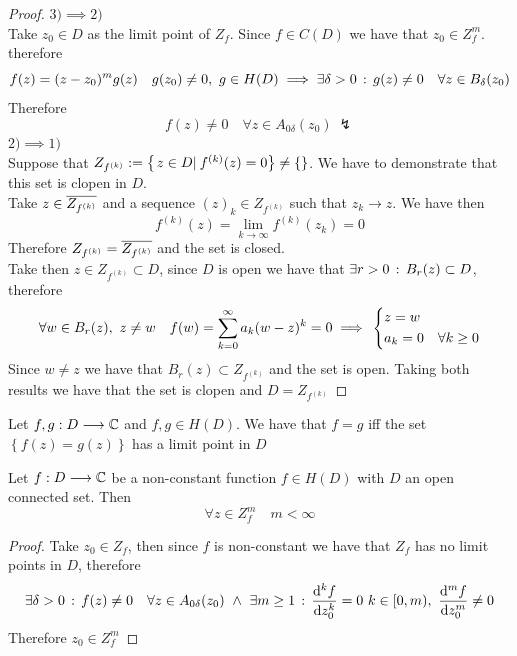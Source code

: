 \documentclass[../complete.tex]{subfiles}
\begin{document}
\begin{proof}
	$3)\implies{} 2)$\\
	Take $z_0\in D$ as the limit point of $Z_f$. Since $f\in C(D)$ we have that $z_0\in Z_f^m$. therefore
	\begin{equation*}
		f(z)=(z-z_0)^mg(z)\quad g(z_0)\ne0,\ g\in H(D)\implies{}\exists\delta>0\, :\,  g(z)\ne0\quad\forall z\in B_\delta(z_0)
	\end{equation*}
	Therefore
	\begin{equation*}
		f(z)\ne0\quad\forall z\in A_{0\delta}(z_0)\ \lightning
	\end{equation*}
	$2)\implies{}1)$\\
	Suppose that $Z_{f^{(k)}}:=\left\{ \left.z\in D\right|_{}f^{(k)}(z)=0 \right\}\ne\{\}$. We have to demonstrate that this set is clopen in $D$.\\
	Take $z\in\overline{Z_{f^{(k)}}}$ and a sequence $(z)_k\in Z_{f^{(k)}}$ such that $z_k\to z$. We have then
	\begin{equation*}
		f^{(k)}(z)=\lim_{k\to\infty}f^{(k)}(z_k)=0
	\end{equation*}
	Therefore $Z_{f^{(k)}}=\overline{Z_{f^{(k)}}}$ and the set is closed.\\
	Take then $z\in Z_{f^{(k)}}\subset D$, since $D$ is open we have that $\exists r>0\, :\,  B_r(z)\subset D$, therefore
	\begin{equation*}
		\forall w\in B_r(z),\ z\ne w\quad f(w)=\sum_{k=0}^\infty a_k(w-z)^k=0\implies{}\begin{dcases}z=w\\a_k=0&\forall k\ge0\end{dcases}
	\end{equation*}
	Since $w\ne z$ we have that $B_r(z)\subset Z_{f^{(k)}}$ and the set is open. Taking both results we have that the set is clopen and $D=Z_{f^{(k)}}$
\end{proof}
\begin{cor}
	Let $f,g:D\overset{}{\longrightarrow}\mathbb{C}$ and $f,g\in  H(D)$. We have that $f=g$ iff the set $\left\{ f(z)=g(z) \right\}$ has a limit point in $D$
\end{cor}
\begin{cor}
	Let $f:D\overset{}{\longrightarrow}\mathbb{C}$ be a non-constant function $f\in H(D)$ with $D$ an open connected set. Then
	\begin{equation*}
		\forall z\in Z_f^m\quad m<\infty
	\end{equation*}
\end{cor}
\begin{proof}
	Take $z_0\in Z_f$, then since $f$ is non-constant we have that $Z_f$ has no limit points in $D$, therefore
	\begin{equation*}
		\exists\delta>0\st f(z)\ne0\quad\forall z\in A_{0\delta}(z_0)\ \wedge\ \exists m\ge1\st\derivative[k]{f}{z_0}=0\ k\in[0,m),\ \derivative[m]{f}{z_0}\ne0
	\end{equation*}
	Therefore $z_0\in Z_f^m$
\end{proof}
\end{document}

